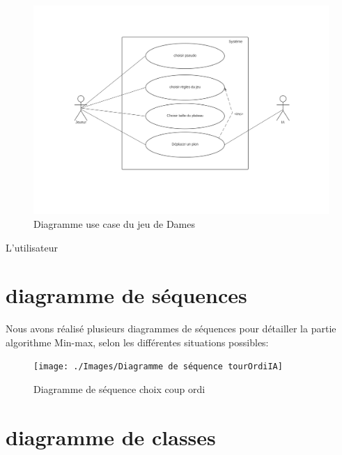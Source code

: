 \documentclass[12,french]{report}
\begin{document}
\begin{figure}[H]
	\center
	\includegraphics[width=1\textwidth]{./Images/Diagramme_use_case}
	\caption{Diagramme use case du jeu de Dames}
\end{figure}\vspace{0.2cm}

L'utilisateur

\section{diagramme de séquences}

Nous avons réalisé plusieurs diagrammes de séquences pour détailler
la partie algorithme Min-max, selon les différentes situations possibles:

\begin{figure}[H]
	\center
	\texttt{[image: ./Images/Diagramme de séquence tourOrdiIA]}
	\caption{Diagramme de séquence choix coup ordi}
\end{figure}\vspace{0.2cm}

\section{diagramme de classes}
\end{document}
